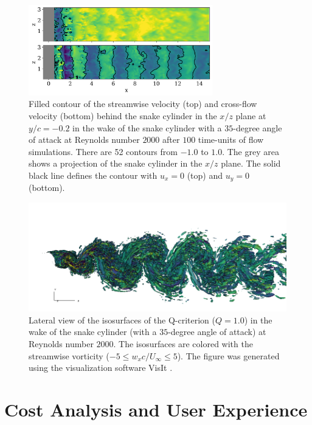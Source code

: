 \documentclass[10pt,journal,compsoc]{IEEEtran}
\begin{document}
\begin{figure}
    \centering
    \includegraphics[width=8cm]{figures/ux_uy_xz_plane.png}
    \caption{Filled contour of the streamwise velocity (top) and cross-flow velocity (bottom) behind the snake cylinder in the $x/z$ plane at $y/c=-0.2$ in the wake of the snake cylinder with a $35$-degree angle of attack at Reynolds number $2000$ after $100$ time-units of flow simulations. There are 52 contours from $-1.0$ to $1.0$. The grey area shows a projection of the snake cylinder in the $x/z$ plane. The solid black line defines the contour with $u_x = 0$ (top) and $u_y = 0$ (bottom).}
    \label{fig:ux_uy_xz_plane_3d}
\end{figure}

\begin{figure}[!h]
    \centering
    \includegraphics[width=18cm]{figures/qcrit_wx_wake3d_0020.png}
    \caption{Lateral view of the isosurfaces of the Q-criterion ($Q = 1.0$) in the wake of the snake cylinder (with a $35$-degree angle of attack) at Reynolds number $2000$. The isosurfaces are colored with the streamwise vorticity ($-5 \leq w_x c / U_\infty \leq 5$). The figure was generated using the visualization software VisIt \cite{childs_et_al_2012}.}
    \label{fig:qcrit_wx_3d}
\end{figure}

\section{Cost Analysis and User Experience}\label{sec:cost}
\end{document}
